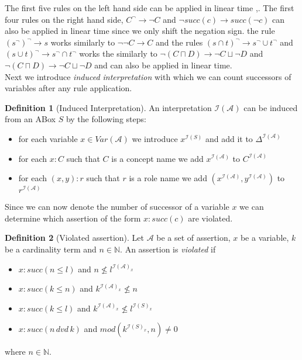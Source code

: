 \documentclass[a4paper,11pt]{scrartcl}
\theoremstyle{break}
\theoremstyle{definition}
\newtheorem{mydef}{Definition}
\begin{document}
The first five rules on the left hand side can be applied in linear time \cite{1},\cite{6}. The first four rules on the right hand side, $C^\neg\rightarrow \neg C$ and $\neg succ(c)\rightarrow succ(\neg c)$ can also be applied in linear time since we only shift the negation sign. the rule $(s^\neg)^\neg\rightarrow s$ works similarly to $\neg\neg C\rightarrow C$ and the rules $(s\cap t)^\neg\rightarrow s^\neg\cup t^\neg$ and $(s\cup t)^\neg\rightarrow s^\neg \cap t^\neg$ works the similarly to $\neg(C\sqcap D)\rightarrow \neg C\sqcup \neg D$ and $\neg(C\sqcap D)\rightarrow \neg C\sqcup \neg D$ and can also be applied in linear time.\\
Next we introduce \textit{induced interpretation} with which we can count successors of variables after any rule application.
\begin{mydef}[Induced Interpretation]
An interpretation $\mathcal{I}(\mathcal{A})$ can be induced from an ABox $S$ by the following steps:
\begin{itemize}
\item for each variable $x\in Var(\mathcal{A})$ we introduce $x^{\mathcal{I}(S)}$ and add it to $\Delta^{\mathcal{I}(\mathcal{A})}$
\item for each $x:C$ such that $C$ is a concept name we add $x^{\mathcal{I}(\mathcal{A})}$ to $C^{\mathcal{I}(\mathcal{A})}$
\item for each $(x,y):r$ such that $r$ is a role name we add $(x^{\mathcal{I}(\mathcal{A})},y^{\mathcal{I}(\mathcal{A})})$ to $r^{\mathcal{I}(\mathcal{A})}$
\end{itemize}
\end{mydef}
Since we can now denote the number of successor of a variable $x$ we can determine which assertion of the form $x:succ(c)$ are violated.
\begin{mydef}[Violated assertion]
Let $\mathcal{A}$ be a set of assertion, $x$ be a variable, $k$ be a cardinality term and $n\in\mathbb{N}$. An assertion is \textit{violated} if
\begin{itemize}
\item $x:succ(n\leq l)$ and $n\not\leq l^{\mathcal{I}(\mathcal{A})_x}$
\item $x:succ(k\leq n)$ and $k^{\mathcal{I}(\mathcal{A})_x}\not\leq n$
\item $x:succ(k\leq l)$ and $k^{\mathcal{I}(\mathcal{A})_x}\not\leq l^{\mathcal{I}(S)_x}$
\item $x:succ(n\,dvd\,k)$ and $mod(k^{\mathcal{I}(S)_x},n)\neq 0$
\end{itemize} 
where $n\in\mathbb{N}$.
\end{mydef}
\end{document}
